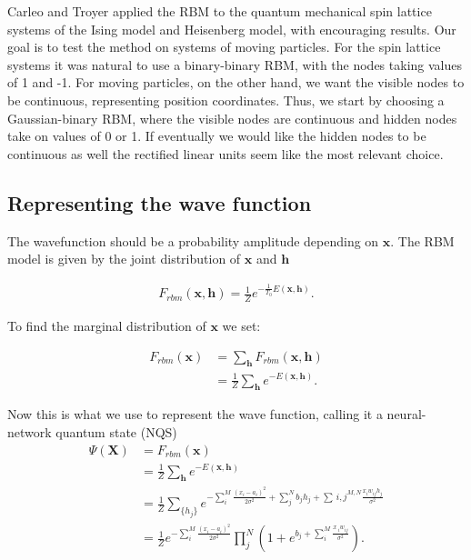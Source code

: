 \documentclass[%
oneside,                 %
final,                   %
10pt]{article}
\begin{document}
\noindent
Carleo and Troyer applied the RBM to the quantum mechanical spin lattice systems of the Ising model and Heisenberg model, with encouraging results. Our goal is to test the method on systems of moving particles. For the spin lattice systems it was natural to use a binary-binary RBM, with the nodes taking values of 1 and -1. For moving particles, on the other hand, we want the visible nodes to be continuous, representing position coordinates. Thus, we start by choosing a Gaussian-binary RBM, where the visible nodes are continuous and hidden nodes take on values of 0 or 1. If eventually we would like the hidden nodes to be continuous as well the rectified linear units seem like the most relevant choice.




\subsection{Representing the wave function}

The wavefunction should be a probability amplitude depending on
 $\bm{x}$. The RBM model is given by the joint distribution of
 $\bm{x}$ and $\bm{h}$

\begin{align}
        F_{rbm}(\mathbf{x},\mathbf{h}) = \frac{1}{Z} e^{-\frac{1}{T_0}E(\mathbf{x},\mathbf{h})}.
\end{align}

To find the marginal distribution of $\bm{x}$ we set:

\begin{align}
        F_{rbm}(\mathbf{x}) &= \sum_\mathbf{h} F_{rbm}(\mathbf{x}, \mathbf{h}) \\
                                &= \frac{1}{Z}\sum_\mathbf{h} e^{-E(\mathbf{x}, \mathbf{h})}.
\end{align}

Now this is what we use to represent the wave function, calling it a neural-network quantum state (NQS)
\begin{align}
        \Psi (\mathbf{X}) &= F_{rbm}(\mathbf{x}) \\
        &= \frac{1}{Z}\sum_{\bm{h}} e^{-E(\mathbf{x}, \mathbf{h})} \\
        &= \frac{1}{Z} \sum_{\{h_j\}} e^{-\sum_i^M \frac{(x_i - a_i)^2}{2\sigma^2} + \sum_j^N b_j h_j + \sum_\
{i,j}^{M,N} \frac{x_i w_{ij} h_j}{\sigma^2}} \\
        &= \frac{1}{Z} e^{-\sum_i^M \frac{(x_i - a_i)^2}{2\sigma^2}} \prod_j^N (1 + e^{b_j + \sum_i^M \frac{x\
_i w_{ij}}{\sigma^2}}). \\
\end{align}
\end{document}
